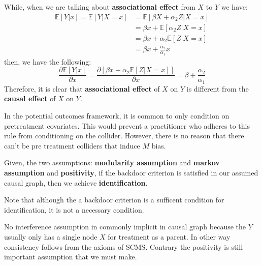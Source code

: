 While, when we are talking about \textbf{associational effect} from $X$ to $Y$ we have:
\begin{equation}
    \begin{array}{ll}
        \mathbb{E}[Y | x] = \mathbb{E}[Y | X = x] & = \mathbb{E}[\beta X + \alpha_2 Z | X = x] \\
                                                  & = \beta x + \mathbb{E}[\alpha_2 Z |X = x]  \\
                                                  & = \beta x + \alpha_2 \mathbb{E}[Z |X = x]  \\
                                                  & = \beta x + \frac{\alpha_2}{\alpha_1} x
    \end{array}
\end{equation}
then, we have the following:
\begin{equation}
    \frac{\partial \mathbb{E}[Y |x]}{\partial x} = \frac{\partial[\beta x + \alpha_2 \mathbb{E}[Z |X = x]]}{\partial x} = \beta + \frac{\alpha_2}{\alpha_1}
\end{equation}
Therefore, it is clear that \textbf{associational effect} of  $X$ on $Y$ is different from the \textbf{causal effect} of $X$ on $Y$.

In the potential outcomes framework, it is common to only condition on pretreatment
covariates. This would prevent a practitioner who adheres to this rule from conditioning on the collider. However, there is no reason that there can’t be pre treatment colliders that induce $M$ bias.

Given, the two assumptions: \textbf{modularity assumption} and \textbf{markov assumption}
and \textbf{positivity}, if the backdoor criterion is satisfied in our assumed causal graph,
then we achieve \textbf{identification}.

\begin{note}
    Note that although the a backdoor criterion is a sufficent condition for identification, it is not a necessary condition.
\end{note}
\begin{note}
    No interference assumption in commonly implicit in causal graph because the $Y$
    usually only has a single node $X$ for treatment as a parent. In other way
    consistency follows from the axioms of SCMS. Contrary the positivity is still important
    assumption that we must make.
\end{note}

